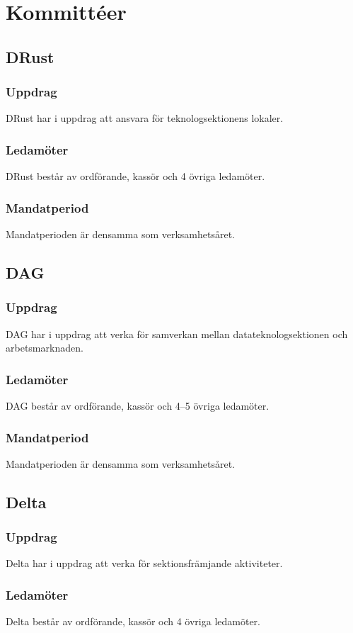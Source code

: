 \section{Kommittéer}

\subsection{DRust}
\subsubsection{Uppdrag}
DRust har i uppdrag att ansvara för teknologsektionens lokaler.
\subsubsection{Ledamöter}
DRust består av ordförande, kassör och 4 övriga ledamöter.
\subsubsection{Mandatperiod}
Mandatperioden är densamma som verksamhetsåret. 

\subsection{DAG}
\subsubsection{Uppdrag} 
DAG har i uppdrag att verka för samverkan mellan datateknologsektionen och arbetsmarknaden. 
\subsubsection{Ledamöter}
DAG består av ordförande, kassör och 4--5 övriga ledamöter.
\subsubsection{Mandatperiod}
Mandatperioden är densamma som verksamhetsåret.

\subsection{Delta}
\subsubsection{Uppdrag}
Delta har i uppdrag att verka för sektionsfrämjande aktiviteter. 
\subsubsection{Ledamöter}
Delta består av ordförande, kassör och 4 övriga ledamöter.
